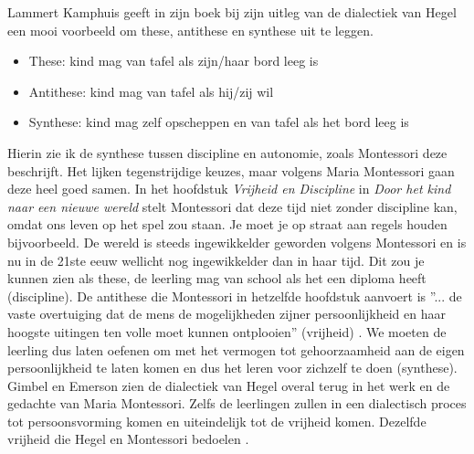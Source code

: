 \documentclass[12pt, a4paper]{article}
\begin{document}
Lammert Kamphuis geeft in zijn boek bij zijn uitleg van de dialectiek van Hegel een mooi voorbeeld om these, antithese en synthese uit te leggen. \cite[p.89]{Kamphuis2023}

\begin{itemize}
\item These: kind mag van tafel als zijn/haar bord leeg is
\item Antithese: kind mag van tafel als hij/zij wil
\item Synthese: kind mag zelf opscheppen en van tafel als het bord leeg is
\end{itemize}

Hierin zie ik de synthese tussen discipline en autonomie, zoals Montessori deze beschrijft. Het lijken tegenstrijdige keuzes, maar volgens Maria Montessori gaan deze heel goed samen. In het hoofdstuk \emph{Vrijheid en Discipline} in \emph{Door het kind naar een nieuwe wereld} stelt Montessori dat deze tijd niet zonder discipline kan, omdat ons leven op het spel zou staan. Je moet je op straat aan regels houden bijvoorbeeld. De wereld is steeds ingewikkelder geworden volgens Montessori en is nu in de 21ste eeuw wellicht nog ingewikkelder dan in haar tijd. Dit zou je kunnen zien als these, de leerling mag van school als het een diploma heeft (discipline). De antithese die Montessori in hetzelfde hoofdstuk aanvoert is ''... de vaste overtuiging dat de mens de mogelijkheden zijner persoonlijkheid en haar hoogste uitingen ten volle moet kunnen ontplooien'' (vrijheid) \cite[p.82]{Montessori1954}. We moeten de leerling dus laten oefenen om met het vermogen tot gehoorzaamheid aan de eigen persoonlijkheid te laten komen en dus het leren voor zichzelf te doen (synthese). Gimbel en Emerson zien de dialectiek van Hegel overal terug in het werk en de gedachte van Maria Montessori. Zelfs de leerlingen zullen in een dialectisch proces tot persoonsvorming komen en uiteindelijk tot de vrijheid komen. Dezelfde vrijheid die Hegel en Montessori bedoelen \cite[]{Gimbel}.
\end{document}

